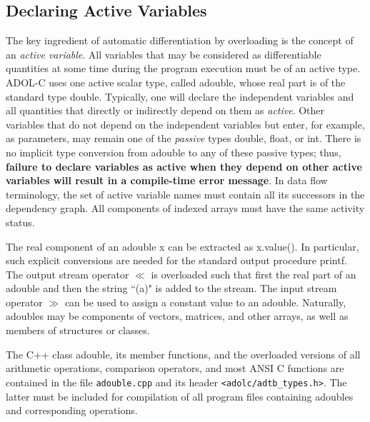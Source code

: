 \documentclass[11pt,twoside]{article}
\begin{document}
\subsection{Declaring Active Variables}
%
\label{DecActVar}
%
The key ingredient of automatic differentiation by overloading is the
concept of an {\em active variable}. All variables that may be
considered as differentiable quantities at some time
during the program execution must be of an active
type. ADOL-C uses one 
active scalar type, called {\sf adouble}, whose real part is of the
standard type {\sf double}. 
Typically, one will declare the independent variables
and all quantities that directly or indirectly depend on them as 
{\em active}. Other variables that do not depend on the independent
variables but enter, for example, as parameters, may remain one of the
{\em passive} types {\sf double, float}, or {\sf int}. There is no
implicit type conversion from {\sf adouble} to any of these passive
types; thus, {\bf failure to declare variables as active when they
depend on other active variables will result in a compile-time error
message}. In data flow terminology, the set of active variable names
must contain all its successors in the dependency graph. All components
of indexed arrays must have the same activity status.

The real component of an {\sf adouble x} can be extracted as
{\sf x.value()}. In particular,
such explicit conversions are needed for the standard output procedure
{\sf printf}. The output stream operator \boldmath $\ll$ \unboldmath is overloaded such
that first the real part of an {\sf adouble} and then the string
``{\sf (a)}" is added to the stream. The input stream operator \boldmath $\gg$ \unboldmath  can
be used to assign a constant value to an {\sf adouble}.
Naturally, {\sf adouble}s may be
components of vectors, matrices, and other arrays, as well as
members of structures or classes. 

The C++ class {\sf adouble}, its member functions, and the overloaded
versions of all arithmetic operations, comparison operators, and 
most ANSI C functions are contained in the file \verb=adouble.cpp= and its
header \verb=<adolc/adtb_types.h>=. The latter must be included for compilation
of all program files containing {\sf adouble}s and corresponding 
operations. 
%
\end{document}
